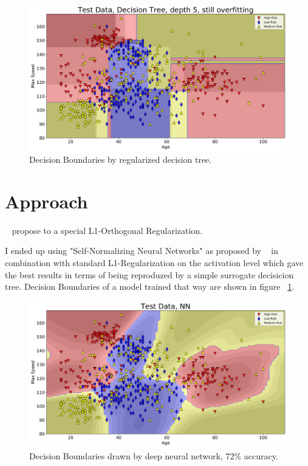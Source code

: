 \documentclass{article} %
\begin{document}
\begin{figure}[h]
\begin{center}
\includegraphics[width=\linewidth]{dt-reg-all.png}
\end{center}
\caption{Decision Boundaries by regularized decision tree.}
\end{figure}


\section{Approach}

 ~\citep{schaaf2019enhancing} propose to a special L1-Orthogonal Regularization. 

I ended up using "Self-Normalizing Neural Networks" as proposed by ~\citep{klambauer2017selfnormalizing} in combination with standard L1-Regularization on the activation level which gave the best results in terms of being reproduzed by a simple surrogate decisicion tree. Decision Boundaries of a model trained that way are shown in figure ~\ref{fig:nn-decision-boundaries}.

\begin{figure}[h]
\begin{center}
\includegraphics[width=\linewidth]{nn.png}
\end{center}
\caption{Decision Boundaries drawn by deep neural network, 72\% accuracy.}
\label{fig:nn-decision-boundaries}
\end{figure}
\end{document}
